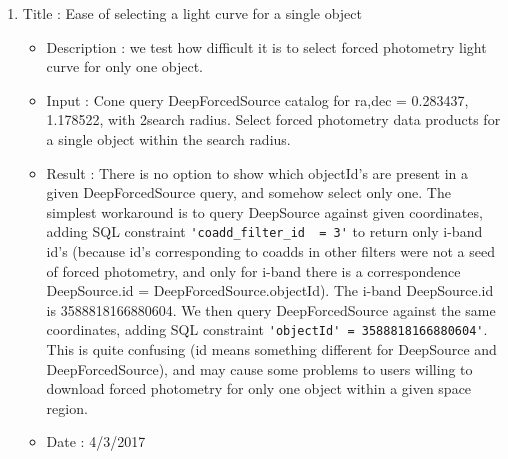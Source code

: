 \documentclass[DM,lsstdraft,toc,usenatbib]{lsstdoc}
\begin{document}
\begin{enumerate}
    \item Title : Ease of selecting a light curve for a single object 
    \begin{itemize}
    	\item Description : we test how  difficult it is to select forced photometry light curve for only one object.
    	\item Input : Cone query DeepForcedSource catalog for  ra,dec = 0.283437\degree, 1.178522\degree, with 2\arcsec  search radius. Select forced photometry data products for a single object within the search radius.  
    	\item Result : There is no option to show which objectId's are present in a given DeepForcedSource query, and somehow select only one.  The simplest workaround is to query  DeepSource against given coordinates,   adding SQL constraint  \verb|'coadd_filter_id  = 3'| to return only i-band id's (because id's corresponding to coadds in other filters were not a seed of forced photometry, and only  for i-band there is a correspondence DeepSource.id = DeepForcedSource.objectId). The i-band DeepSource.id is  3588818166880604. We then query DeepForcedSource against the same coordinates, adding SQL constraint \verb|'objectId' = 3588818166880604'|. This is quite confusing (id means something different for DeepSource and DeepForcedSource), and may cause some problems to users willing to download forced photometry for only one object within a given space region. 
      \item Date : 4/3/2017
    \end{itemize}
\end{enumerate}
\end{document}
